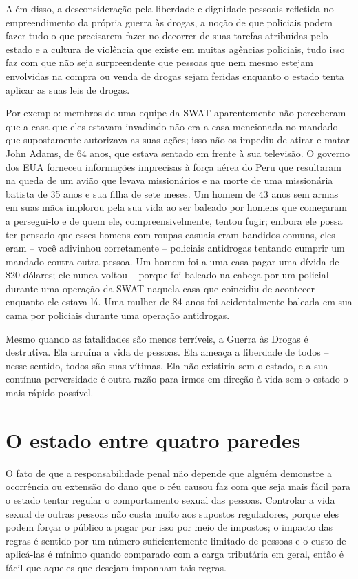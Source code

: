 Além disso, a desconsideração pela liberdade e dignidade pessoais refletida no empreendimento da própria guerra às drogas, a noção de que policiais podem fazer tudo o que precisarem fazer no decorrer de suas tarefas atribuídas pelo estado e a cultura de violência que existe em muitas agências policiais, tudo isso faz com que não seja surpreendente que pessoas que nem mesmo estejam envolvidas na compra ou venda de drogas sejam feridas enquanto o estado tenta aplicar as suas leis de drogas.

Por exemplo: membros de uma equipe da SWAT aparentemente não perceberam que a casa que eles estavam invadindo não era a casa mencionada no mandado que supostamente autorizava as suas ações; isso não os impediu de atirar e matar John Adams, de 64 anos, que estava sentado em frente à sua televisão. O governo dos EUA forneceu informações imprecisas à força aérea do Peru que resultaram na queda de um avião que levava missionários e na morte de uma missionária batista de 35 anos e sua filha de sete meses. Um homem de 43 anos sem armas em suas mãos implorou pela sua vida ao ser baleado por homens que começaram a persegui-lo e de quem ele, compreensivelmente, tentou fugir; embora ele possa ter pensado que esses homens com roupas casuais eram bandidos comuns, eles eram -- você adivinhou corretamente -- policiais antidrogas tentando cumprir um mandado contra outra pessoa. Um homem foi a uma casa pagar uma dívida de \$20 dólares; ele nunca voltou -- porque foi baleado na cabeça por um policial durante uma operação da SWAT naquela casa que coincidiu de acontecer enquanto ele estava lá. Uma mulher de 84 anos foi acidentalmente baleada em sua cama por policiais durante uma operação antidrogas.

Mesmo quando as fatalidades são menos terríveis, a Guerra às Drogas é destrutiva. Ela arruína a vida de pessoas. Ela ameaça a liberdade de todos -- nesse sentido, todos são suas vítimas. Ela não existiria sem o estado, e a sua contínua perversidade é outra razão para irmos em direção à vida sem o estado o mais rápido possível.

\section{O estado entre quatro paredes}

O fato de que a responsabilidade penal não depende que alguém demonstre a ocorrência ou extensão do dano que o réu causou faz com que seja mais fácil para o estado tentar regular o comportamento sexual das pessoas. Controlar a vida sexual de outras pessoas não custa muito aos supostos reguladores, porque eles podem forçar o público a pagar por isso por meio de impostos; o impacto das regras é sentido por um número suficientemente limitado de pessoas e o custo de aplicá-las é mínimo quando comparado com a carga tributária em geral, então é fácil que aqueles que desejam imponham tais regras.

